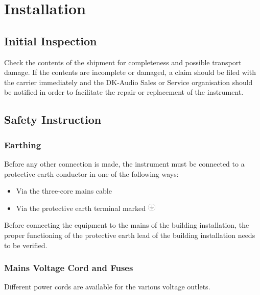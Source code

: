 \section{Installation}
\label{cha:Installation}

\subsection{Initial Inspection}
Check the contents of the shipment for completeness and possible transport damage. If the contents are incomplete or damaged, a claim should be filed with the carrier immediately and the DK-Audio Sales or Service organisation should be notified in order to facilitate the repair or replacement of the instrument.

\subsection{Safety Instruction}
\subsubsection{Earthing}
Before any other connection is made, the instrument must be connected to a protective earth conductor in one of the following ways:
\begin{itemize}
\item Via the three-core mains cable
\item Via the protective earth terminal marked \includegraphics[width=1em]{fig/ground_symbol}
\end{itemize}

Before connecting the equipment to the mains of the building installation, the proper functioning of the protective earth lead of the building installation needs to be verified.

\begin{center}
\end{center}

\subsubsection{Mains Voltage Cord and Fuses}
Different power cords are available for the various voltage outlets.

